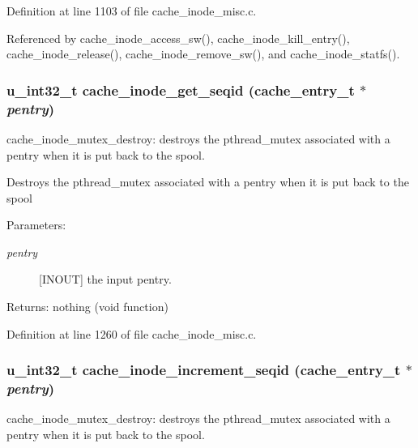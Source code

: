 Definition at line 1103 of file cache\_\-inode\_\-misc.c.

Referenced by cache\_\-inode\_\-access\_\-sw(), cache\_\-inode\_\-kill\_\-entry(), cache\_\-inode\_\-release(), cache\_\-inode\_\-remove\_\-sw(), and cache\_\-inode\_\-statfs().
\subsubsection{\setlength{\rightskip}{0pt plus 5cm}u\_\-int32\_\-t cache\_\-inode\_\-get\_\-seqid (cache\_\-entry\_\-t $\ast$ {\em pentry})}\label{cache__inode__misc_8c_a14}


cache\_\-inode\_\-mutex\_\-destroy: destroys the pthread\_\-mutex associated with a pentry when it is put back to the spool.

Destroys the pthread\_\-mutex associated with a pentry when it is put back to the spool

\begin{Desc}
\item[Parameters:]
\begin{description}
\item[{\em pentry}][INOUT] the input pentry.\end{description}
\end{Desc}
\begin{Desc}
\item[Returns:]nothing (void function) \end{Desc}


Definition at line 1260 of file cache\_\-inode\_\-misc.c.
\subsubsection{\setlength{\rightskip}{0pt plus 5cm}u\_\-int32\_\-t cache\_\-inode\_\-increment\_\-seqid (cache\_\-entry\_\-t $\ast$ {\em pentry})}\label{cache__inode__misc_8c_a13}


cache\_\-inode\_\-mutex\_\-destroy: destroys the pthread\_\-mutex associated with a pentry when it is put back to the spool.

